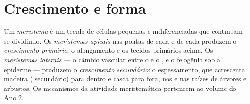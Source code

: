 \section{Crescimento e forma}

\begin{definition}\label{def:b1:flowering-plant-organization:meristem}
Um \emph{meristema} é um tecido de células pequenas e
indiferenciadas que continuam se dividindo. Os
\emph{meristemas apicais} nas pontas de cada
 e de cada  produzem o
\emph{crescimento primário}: o alongamento e
os tecidos primários acima. Os
\emph{meristemas laterais} --- o câmbio
vascular entre o  e o , e o felogênio sob a epiderme ---
produzem o
\emph{crescimento secundário}: o
espessamento, que acrescenta madeira ( secundário) para dentro e
casca para fora, nos  e nas raízes de árvores e arbustos. Os
mecanismos da atividade meristemática pertencem ao volume do Ano 2.
\end{definition}

